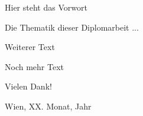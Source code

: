 Hier steht das Vorwort

\vspace{\baselineskip}
\noindent Die Thematik dieser Diplomarbeit ...

\vspace{\baselineskip}
\noindent Weiterer Text

\vspace{\baselineskip}
\noindent Noch mehr Text

\vspace{\baselineskip}
\noindent Vielen Dank!
\vspace{\baselineskip}


\vspace{\baselineskip}
\noindent Wien, XX. Monat, Jahr